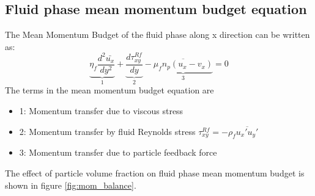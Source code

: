 \documentclass[aip,graphicx]{revtex4-1}
\begin{document}
   \subsection{Fluid phase mean momentum budget equation}
   \label{sec:mean_momentum_budget}
   The Mean Momentum Budget of the fluid phase along x direction can be written as: 
      \begin{equation}
   \underbrace{\eta_f\frac{d^2\bar{u_x}}{dy^2}}_{1}+\underbrace{\frac{d\tau_{xy}^{Rf}}{dy}}_{2}-\underbrace{\overline{\mu_fn_p(u_x-v_x)}}_{3}=0
   	\label{eq:momentum balance}
   \end{equation}
The terms in the mean momentum budget equation are    
   \begin{itemize}
   	\item 1: Momentum transfer due to viscous stress
   	\item 2: Momentum transfer by fluid Reynolds stress $\tau_{xy}^{Rf}=-\rho_f\overline{u_x'u_y'}$
   	\item 3: Momentum transfer due to particle feedback force
   \end{itemize}
   The effect of particle volume fraction on fluid phase mean momentum budget is shown in figure \ref{fig:mom_balance}.
\end{document}
